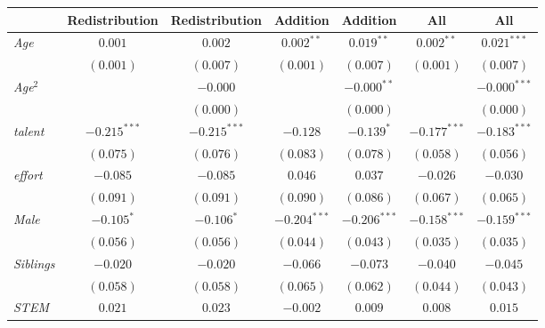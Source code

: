 
\begin{table}[htpb]
\begin{center}
\begin{footnotesize}
\begin{tabular}{l c c c c c c}
\toprule
 & Redistribution & Redistribution & Addition & Addition & All & All \\
\midrule
\textit{Age}                           & $0.001$        & $0.002$        & $0.002^{**}$   & $0.019^{**}$   & $0.002^{**}$   & $0.021^{***}$  \\
                                       & $(0.001)$      & $(0.007)$      & $(0.001)$      & $(0.007)$      & $(0.001)$      & $(0.007)$      \\
\textit{Age}$^2$                       &                & $-0.000$       &                & $-0.000^{**}$  &                & $-0.000^{***}$ \\
                                       &                & $(0.000)$      &                & $(0.000)$      &                & $(0.000)$      \\
\textit{talent}                        & $-0.215^{***}$ & $-0.215^{***}$ & $-0.128$       & $-0.139^{*}$   & $-0.177^{***}$ & $-0.183^{***}$ \\
                                       & $(0.075)$      & $(0.076)$      & $(0.083)$      & $(0.078)$      & $(0.058)$      & $(0.056)$      \\
\textit{effort}                        & $-0.085$       & $-0.085$       & $0.046$        & $0.037$        & $-0.026$       & $-0.030$       \\
                                       & $(0.091)$      & $(0.091)$      & $(0.090)$      & $(0.086)$      & $(0.067)$      & $(0.065)$      \\
\textit{Male}                          & $-0.105^{*}$   & $-0.106^{*}$   & $-0.204^{***}$ & $-0.206^{***}$ & $-0.158^{***}$ & $-0.159^{***}$ \\
                                       & $(0.056)$      & $(0.056)$      & $(0.044)$      & $(0.043)$      & $(0.035)$      & $(0.035)$      \\
\textit{Siblings}                      & $-0.020$       & $-0.020$       & $-0.066$       & $-0.073$       & $-0.040$       & $-0.045$       \\
                                       & $(0.058)$      & $(0.058)$      & $(0.065)$      & $(0.062)$      & $(0.044)$      & $(0.043)$      \\
\textit{STEM}                          & $0.021$        & $0.023$        & $-0.002$       & $0.009$        & $0.008$        & $0.015$        \\

\end{tabular}
\end{footnotesize}
\end{center}
\end{table}
